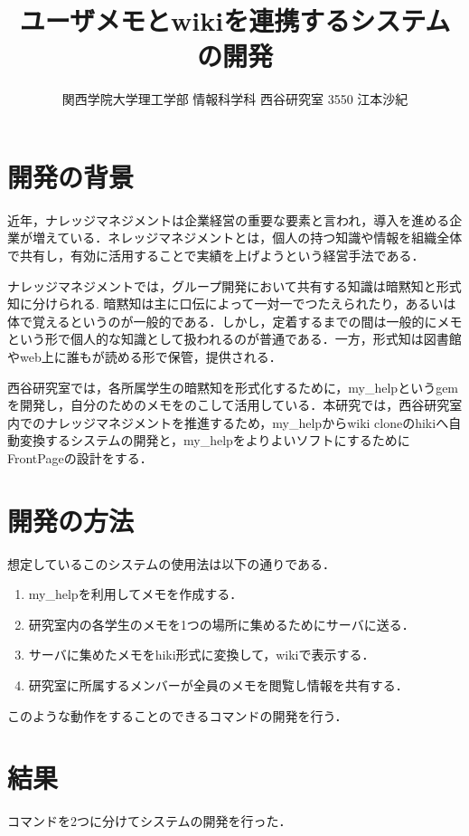 \documentclass[10pt,a4j,twocolumn]{jsarticle}
\begin{document}
\title{ユーザメモとwikiを連携するシステムの開発}
\author{関西学院大学理工学部 情報科学科 西谷研究室 3550 江本沙紀}
\date{}
\maketitle
\section{開発の背景}
近年，ナレッジマネジメントは企業経営の重要な要素と言われ，導入を進める企業が増えている．ネレッジマネジメントとは，個人の持つ知識や情報を組織全体で共有し，有効に活用することで実績を上げようという経営手法である．

ナレッジマネジメントでは，グループ開発において共有する知識は暗黙知と形式知に分けられる\cite{km}. 暗黙知は主に口伝によって一対一でつたえられたり，あるいは体で覚えるというのが一般的である．しかし，定着するまでの間は一般的にメモという形で個人的な知識として扱われるのが普通である．一方，形式知は図書館やweb上に誰もが読める形で保管，提供される．

西谷研究室では，各所属学生の暗黙知を形式化するために，my\_helpというgemを開発し，自分のためのメモをのこして活用している．本研究では，西谷研究室内でのナレッジマネジメントを推進するため，my\_helpからwiki cloneのhikiへ自動変換するシステムの開発と，my\_helpをよりよいソフトにするためにFrontPageの設計をする．

\section{開発の方法}
想定しているこのシステムの使用法は以下の通りである．

\begin{enumerate}
\item my\_helpを利用してメモを作成する．
\item 研究室内の各学生のメモを1つの場所に集めるためにサーバに送る．
\item サーバに集めたメモをhiki形式に変換して，wikiで表示する．
\item 研究室に所属するメンバーが全員のメモを閲覧し情報を共有する．
\end{enumerate}
このような動作をすることのできるコマンドの開発を行う．

\section{結果}
コマンドを2つに分けてシステムの開発を行った．
\end{document}
